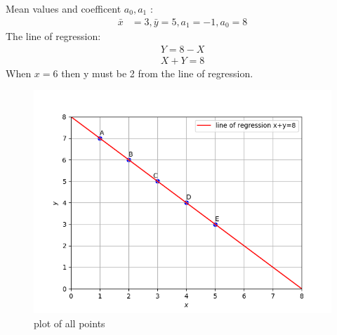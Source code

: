 \documentclass[journal,12pt,twocolumn]{IEEEtran}
\begin{document}
Mean values and coefficent $a_0 ,a_1$ :
\begin{align}
	\bar{x}&=3,
	\bar{y}=5,
	a_{1}=-1, 
	 a_{0}=8
\end{align}
The line of regression:
\begin{align}
Y=8-X\\
X+Y=8
\end{align}
When $x=6$ then y must be 2 from the line of regression.

\begin{figure}[h!]
		\centering
	\includegraphics[width=\columnwidth]{./figs/fig1.png}
	\caption{plot of all points}
	\label{Fig1}
	\end{figure}
\end{document}
